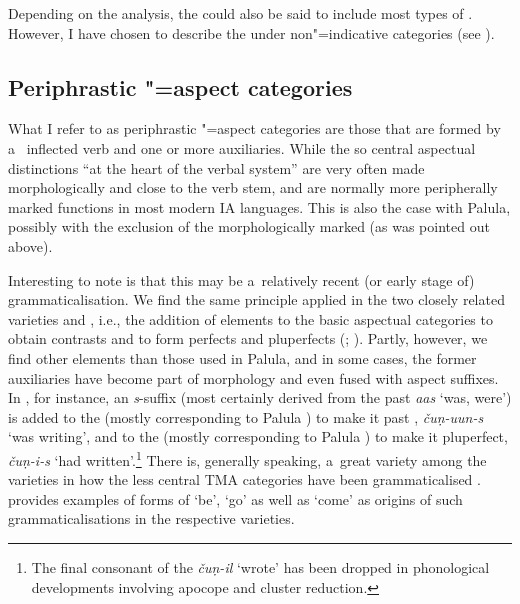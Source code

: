 Depending on the analysis, the  could also be said to include most types of . However, I have chosen to describe the  under non"=indicative categories (see ).


\subsection{Periphrastic "=aspect categories}
\label{subsec:9-1-5}

What I refer to as periphrastic "=aspect categories are those that are formed by a~ inflected verb and one or more auxiliaries. While the so central aspectual distinctions ``at the heart of the \iliNIA verbal system'' \citep[262]{masica1991} are very often made morphologically and close to the verb stem,  and  are normally more peripherally marked functions in most modern IA languages. This is also the case with Palula, possibly with the exclusion of the morphologically marked  (as was pointed out above). 



Interesting to note is that this may be a~relatively recent (or early stage of) grammaticalisation. We find the same principle applied in the two closely related varieties \iliSauji and \iliKalkoti, i.e., the addition of elements to the basic aspectual categories to obtain  contrasts and to form perfects and pluperfects (\citealt[48--55]{buddruss1967}; \citealt[48--53]{liljegren2009}). Partly, however, we find other elements than those used in Palula, and in some cases, the former auxiliaries have become part of  morphology and even fused with aspect suffixes. In \iliKalkoti, for instance, an \textit{s}-suffix (most certainly derived from the past  \textit{aas} `was, were') is added to the  (mostly corresponding to Palula ) to make it past , \textit{čuṇ-uun-s} `was writing', and to the  (mostly corresponding to Palula ) to make it pluperfect, \textit{čuṇ-i-s} `had written'.\footnote{The final consonant of the  \textit{čuṇ-il} `wrote' has been dropped in phonological developments involving apocope and cluster reduction.} There is, generally speaking, a~great variety among the \iliShina varieties in how the less central TMA categories have been grammaticalised \citep[144--156]{liljegren2013}. \citet[38]{schmidt2004} provides examples of forms of `be', `go' as well as `come' as origins of such grammaticalisations in the respective varieties. 



